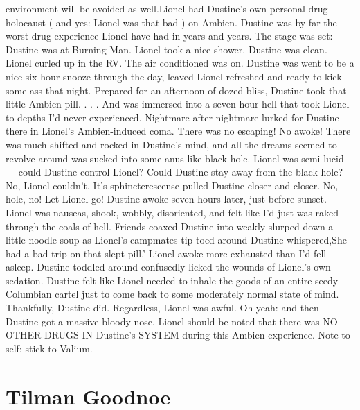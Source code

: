 \documentclass[12pt]{book}
\begin{document}
environment will be avoided as well.Lionel had Dustine's own personal drug holocaust ( and yes: Lionel was that bad ) on Ambien. Dustine was by far the worst drug experience Lionel have had in years and years. The stage was set: Dustine was at Burning Man. Lionel took a nice shower. Dustine was clean. Lionel curled up in the RV. The air conditioned was on. Dustine was went to be a nice six hour snooze through the day, leaved Lionel refreshed and ready to kick some ass that night. Prepared for an afternoon of dozed bliss, Dustine took that little Ambien pill.  . . .  And was immersed into a seven-hour hell that took Lionel to depths I'd never experienced. Nightmare after nightmare lurked for Dustine there in Lionel's Ambien-induced coma. There was no escaping! No awoke! There was much shifted and rocked in Dustine's mind, and all the dreams seemed to revolve around was sucked into some anus-like black hole. Lionel was semi-lucid --- could Dustine control Lionel? Could Dustine stay away from the black hole? No, Lionel couldn't. It's sphincterescense pulled Dustine closer and closer. No, hole, no! Let Lionel go! Dustine awoke seven hours later, just before sunset. Lionel was nauseas, shook, wobbly, disoriented, and felt like I'd just was raked through the coals of hell. Friends coaxed Dustine into weakly slurped down a little noodle soup as Lionel's campmates tip-toed around Dustine whispered,She had a bad trip on that slept pill.' Lionel awoke more exhausted than I'd fell asleep. Dustine toddled around confusedly licked the wounds of Lionel's own sedation. Dustine felt like Lionel needed to inhale the goods of an entire seedy Columbian cartel just to come back to some moderately normal state of mind. Thankfully, Dustine did. Regardless, Lionel was awful. Oh yeah: and then Dustine got a massive bloody nose. Lionel should be noted that there was NO OTHER DRUGS IN Dustine's SYSTEM during this Ambien experience. Note to self: stick to Valium.



\chapter{Tilman Goodnoe}
\end{document}
